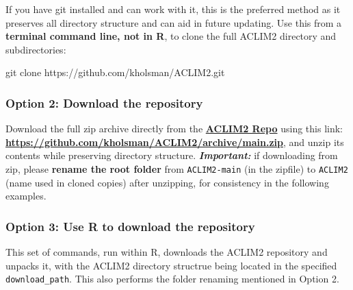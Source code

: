 \documentclass[
]{article}
\newenvironment{Shaded}{\begin{snugshade}}{\end{snugshade}}
\newcommand{\FunctionTok}[1]{\textcolor[rgb]{0.00,0.00,0.00}{#1}}
\newcommand{\NormalTok}[1]{#1}
\begin{document}
If you have git installed and can work with it, this is the preferred
method as it preserves all directory structure and can aid in future
updating. Use this from a \textbf{terminal command line, not in R}, to
clone the full ACLIM2 directory and subdirectories:

\begin{Shaded}
\begin{Highlighting}[]
    \FunctionTok{git}\NormalTok{ clone https://github.com/kholsman/ACLIM2.git}
\end{Highlighting}
\end{Shaded}

\hypertarget{option-2-download-the-repository}{%
\subsubsection{Option 2: Download the
repository}\label{option-2-download-the-repository}}

Download the full zip archive directly from the
\href{https://github.com/kholsman/ACLIM2}{\textbf{ACLIM2 Repo}} using
this link:
\href{https://github.com/kholsman/ACLIM2/archive/main.zip}{\textbf{https://github.com/kholsman/ACLIM2/archive/main.zip}},
and unzip its contents while preserving directory structure.
\textbf{\emph{Important:}} if downloading from zip, please
\textbf{rename the root folder} from \texttt{ACLIM2-main} (in the
zipfile) to \texttt{ACLIM2} (name used in cloned copies) after
unzipping, for consistency in the following examples.

\hypertarget{option-3-use-r-to-download-the-repository}{%
\subsubsection{Option 3: Use R to download the
repository}\label{option-3-use-r-to-download-the-repository}}

This set of commands, run within R, downloads the ACLIM2 repository and
unpacks it, with the ACLIM2 directory structrue being located in the
specified \texttt{download\_path}. This also performs the folder
renaming mentioned in Option 2.
\end{document}
